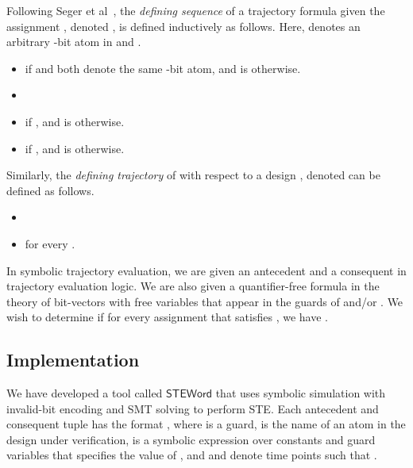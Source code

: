 \documentclass{llncs}
\newcommand{\steword}{\ensuremath{\mathsf{STEWord}}}
\begin{document}
Following Seger et al~\cite{BryantSeger90,SegerJOMABS05}, the
\emph{defining sequence} of a trajectory formula  given the
assignment , denoted , is defined inductively as
follows.  Here,  denotes an arbitrary -bit atom in
 and .
\begin{itemize}
\item  if  and both 
  denote the same -bit atom, and is  otherwise.
\item 
\item  if , and is  otherwise.
\item  if , and is 
  otherwise.
\end{itemize}
Similarly, the \emph{defining trajectory} of  with respect to
a design , denoted  can be defined as
follows.
\begin{itemize}
\item 
\item  for every .
\end{itemize}
In symbolic trajectory evaluation, we are given an antecedent 
and a consequent  in trajectory evaluation logic.  We are also
given a quantifier-free formula  in the theory of bit-vectors
with free variables that appear in the guards of  and/or
.  We wish to determine if for every assignment  that
satisfies , we have .



\subsection{Implementation}
We have developed a tool called {\steword} that uses symbolic
simulation with invalid-bit encoding and SMT solving to perform STE.
Each antecedent and consequent tuple has the format , where  is a guard,  is the name of an
atom in the design under verification,  is a symbolic
expression over constants and guard variables that specifies the value
of , and  and  denote time points such that .
\end{document}
